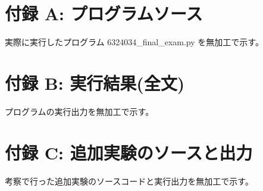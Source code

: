 \section{付録 A: プログラムソース}

実際に実行したプログラム 6324034\_final\_exam.py を無加工で示す。

{\small

}

\section{付録 B: 実行結果(全文)}

プログラムの実行出力を無加工で示す。

{\small

}

\section{付録 C: 追加実験のソースと出力}

考察で行った追加実験のソースコードと実行出力を無加工で示す。





